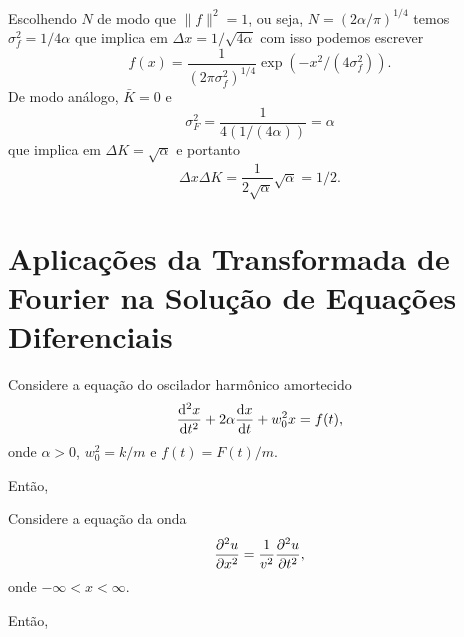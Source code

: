 Escolhendo $N$ de modo que $\| f \|^2 = 1$, ou seja, $N = \left( 2 \alpha / \pi
\right)^{1/4}$ temos $\sigma_f^2 = 1 / 4 \alpha$ que implica em $\Delta x = 1 /
\sqrt{4 \alpha}$ com isso podemos escrever
\begin{dmath*}
  f(x) = \frac{1}{(2 \pi \sigma_f^2)^{1/4}} \exp(-x^2 / (4 \sigma_f^2)).
\end{dmath*}
De modo análogo, $\bar{K} = 0$ e
\begin{dmath*}
  \sigma_F^2 = \frac{1}{4 \left( 1 / (4 \alpha) \right)}
  = \alpha
\end{dmath*}
que implica em $\Delta K = \sqrt{\alpha}$ e portanto
\begin{dmath*}
  \Delta x \Delta K = \frac{1}{2 \sqrt{\alpha}} \sqrt{\alpha}
  = 1 / 2.
\end{dmath*}

\section[Aplicações na Solução de Equações Diferenciais]{Aplicações da Transformada de Fourier na Solução de Equações
Diferenciais}
\begin{exem}
  Considere a equação do oscilador harmônico amortecido
  \begin{dmath*}
    \fder{^2 x}{t^2} + 2 \alpha \fder{x}{t} + w_0^2 x = f(t),
  \end{dmath*}
  onde $\alpha > 0$, $w_0^2 = k / m$ e $f(t) = F(t) / m$.

  Então,
\end{exem}

\begin{exem}
  Considere a equação da onda
  \begin{dmath*}
    \pder{^2 u}{x^2} = \frac{1}{v^2} \pder{^2 u}{t^2},
  \end{dmath*}
  onde $-\infty < x < \infty$.

  Então,
\end{exem}

